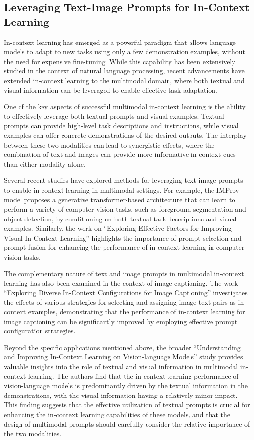 \documentclass[11pt]{article}
\begin{document}
\subsection{Leveraging Text-Image Prompts for In-Context Learning}

In-context learning has emerged as a powerful paradigm that allows language models to adapt to new tasks using only a few demonstration examples, without the need for expensive fine-tuning. While this capability has been extensively studied in the context of natural language processing, recent advancements have extended in-context learning to the multimodal domain, where both textual and visual information can be leveraged to enable effective task adaptation.

One of the key aspects of successful multimodal in-context learning is the ability to effectively leverage both textual prompts and visual examples. Textual prompts can provide high-level task descriptions and instructions, while visual examples can offer concrete demonstrations of the desired outputs. The interplay between these two modalities can lead to synergistic effects, where the combination of text and images can provide more informative in-context cues than either modality alone.

Several recent studies have explored methods for leveraging text-image prompts to enable in-context learning in multimodal settings. For example, the IMProv model \cite{ref55} proposes a generative transformer-based architecture that can learn to perform a variety of computer vision tasks, such as foreground segmentation and object detection, by conditioning on both textual task descriptions and visual examples. Similarly, the work on ``Exploring Effective Factors for Improving Visual In-Context Learning'' \cite{ref56} highlights the importance of prompt selection and prompt fusion for enhancing the performance of in-context learning in computer vision tasks.

The complementary nature of text and image prompts in multimodal in-context learning has also been examined in the context of image captioning. The work ``Exploring Diverse In-Context Configurations for Image Captioning'' \cite{ref57} investigates the effects of various strategies for selecting and assigning image-text pairs as in-context examples, demonstrating that the performance of in-context learning for image captioning can be significantly improved by employing effective prompt configuration strategies.

Beyond the specific applications mentioned above, the broader ``Understanding and Improving In-Context Learning on Vision-language Models'' \cite{ref28} study provides valuable insights into the role of textual and visual information in multimodal in-context learning. The authors find that the in-context learning performance of vision-language models is predominantly driven by the textual information in the demonstrations, with the visual information having a relatively minor impact. This finding suggests that the effective utilization of textual prompts is crucial for enhancing the in-context learning capabilities of these models, and that the design of multimodal prompts should carefully consider the relative importance of the two modalities.
\end{document}
